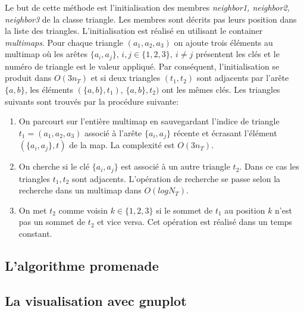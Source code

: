 \documentclass[10pt]{article}
\begin{document}
Le but de cette m\'ethode est l'initialisation des membres {\itshape neighbor1, neighbor2, neighbor3} de la classe triangle. Les membres sont décrits pas leurs position dans la liste des triangles. L'initialisation est réalisé en utilisant le container {\itshape multimaps}.  Pour chaque triangle $(a_1,a_2,a_3)$ on ajoute trois éléments au multimap où les arêtes $\{a_i,a_j \}, \, i,j \in \{1,2,3\}, \ i \neq j $ présentent les clés et le numéro de triangle est le valeur appliqué. Par conséquent, l'initialisation se produit dans $ O(3 n_T)$ et si deux triangles $(t_1,t_2) $ sont adjacents par l'arête $\{a,b\}$, les éléments $ ( \{a,b\}, t_1), \, \{a,b\}, t_2) $ ont les mêmes clés. 
Les triangles suivants sont trouvés par la procédure suivante: 
\begin{enumerate}
	\item On parcourt sur l'entière multimap en sauvegardant l'indice de  triangle $t_1 = (a_1,a_2,a_3) $ associé à l'arête $ \{a_i,a_j\} $ récente et écrasant l'élément $(\{a_i,a_j\}, t) $ de la map. La complexité est $ O(3 n_T)$.
	\item On cherche si le clé $ \{a_i,a_j\} $ est associé à un autre triangle $t_2$. Dans ce cas les triangles $t_1,t_2$ sont adjacents. 
	L'opération de recherche se passe selon la recherche dans un multimap dans $O(log N_T) $.
	\item On met $t_2 $ comme voisin $k \in \{1,2,3\}$ si le sommet de $t_1 $ au position $k$ n'est pas un sommet de $t_2 $ et vice versa. Cet opération est réalisé dans un temps constant. 
\end{enumerate}

\subsection{L'algorithme promenade}


\subsection{La visualisation avec gnuplot}
\end{document}
